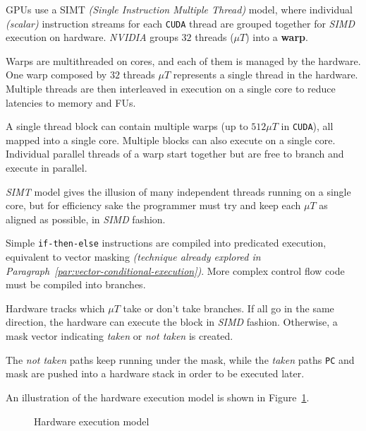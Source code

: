 \documentclass[english]{article}
\begin{document}
\bigskip
GPUs use a SIMT \textit{(Single Instruction Multiple Thread)} model, where individual \textit{(scalar)} instruction streams for each \texttt{CUDA} thread are grouped together for \textit{SIMD} execution on hardware.
\textit{NVIDIA} groups \(32\) threads (\(\mu T\)) into a \textbf{warp}.

Warps are multithreaded on cores, and each of them is managed by the hardware.
One warp composed by \(32\) threads \textit{\(\mu T\)} represents a single thread in the hardware.
Multiple threads are then interleaved in execution on a single core to reduce latencies to memory and FUs.

A single thread block can contain multiple warps (up to \(512 \mu T\) in \texttt{CUDA}), all mapped into a single core.
Multiple blocks can also execute on a single core.
Individual parallel threads of a warp start together but are free to branch and execute in parallel.

\textit{SIMT} model gives the illusion of many independent threads running on a single core, but for efficiency sake the programmer must try and keep each \(\mu T\) as aligned as possible, in \textit{SIMD} fashion.

\bigskip
Simple \texttt{if-then-else} instructions are compiled into predicated execution, equivalent to vector masking \textit{(technique already explored in Paragraph~\ref{par:vector-conditional-execution})}.
More complex control flow code must be compiled into branches.

Hardware tracks which \(\mu T\) take or don't take branches.
If all go in the same direction, the hardware can execute the block in \textit{SIMD} fashion.
Otherwise, a mask vector indicating \textit{taken} or \textit{not taken} is created.

The \textit{not taken} paths keep running under the mask,  while the \textit{taken} paths \texttt{PC} and mask are pushed into a hardware stack in order to be executed later.

\bigskip
An illustration of the hardware execution model is shown in Figure~\ref{fig:gpu-hardware-model}.

\begin{figure}[htbp]
  \bigskip
  \centering
  \caption{Hardware execution model}
  \label{fig:gpu-hardware-model}
  \bigskip
\end{figure}
\end{document}
